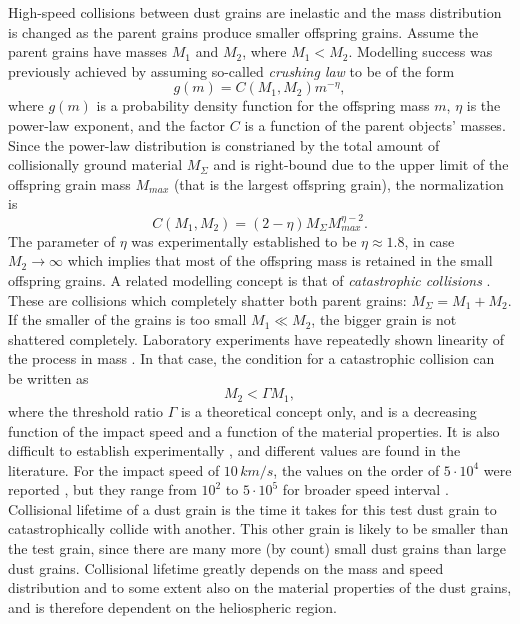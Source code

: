High-speed collisions between dust grains are inelastic and the mass distribution is changed as the parent grains produce smaller offspring grains. Assume the parent grains have masses $M_1$ and $M_2$, where $M_1 < M_2$. Modelling success was previously achieved \citep{gault1963spray,dohnanyi1969collisional} by assuming so-called \textit{crushing law} to be of the form
\begin{equation}
    g(m) = C(M_1,M_2)m^{-\eta},
    \label{eq:crushing_law}
\end{equation}
where $g(m)$ is a probability density function for the offspring mass $m$, $\eta$ is the power-law exponent, and the factor $C$ is a function of the parent objects' masses. Since the power-law distribution is constrianed by the total amount of collisionally ground material $M_\Sigma$ and is right-bound due to the upper limit of the offspring grain mass $M_{max}$ (that is the largest offspring grain), the normalization is
\begin{equation}
    C(M_1,M_2) = (2-\eta) M_\Sigma M_{max}^{\eta -2}.
\end{equation}
The parameter of $\eta$ was experimentally established \citep{gault1963spray} to be $\eta \approx 1.8$, in case $M_2 \rightarrow \infty$ which implies that most of the offspring mass is retained in the small offspring grains. 
A related modelling concept is that of \textit{catastrophic collisions} \citep{dohnanyi1969collisional,grun1985collisional}. These are collisions which completely shatter both parent grains: $M_\Sigma = M_1 + M_2$. If the smaller of the grains is too small $M_1 \ll M_2$, the bigger grain is not shattered completely. Laboratory experiments have repeatedly shown linearity of the process in mass \citep{gault1963spray,dietzel1973heos,grun1984impact,mcbride1999meteoroid,collette2014micrometeoroid,shen2021cosmic}. In that case, the condition for a catastrophic collision can be written as 
\begin{equation}
    M_2 < \Gamma M_1,
\end{equation}
where the threshold ratio $\Gamma$ is a theoretical concept only, and is a decreasing function of the impact speed and a function of the material properties. It is also difficult to establish experimentally \citep{grun1985collisional}, and different values are found in the literature. For the impact speed of $10 \, \si{km/s}$, the values on the order of $5 \cdot 10^{4}$ were reported \citep{gault1969destruction,fujiwara1977destruction}, but they range from $10^2$ to $5\cdot 10^5$ for broader speed interval \citep{whipple1967maintaining,zook1975source,dohnanyi1978particle}. 
Collisional lifetime of a dust grain is the time it takes for this test dust grain to catastrophically collide with another. This other grain is likely to be smaller than the test grain, since there are many more (by count) small dust grains than large dust grains. Collisional lifetime greatly depends on the mass and speed distribution and to some extent also on the material properties of the dust grains, and is therefore dependent on the heliospheric region. 

